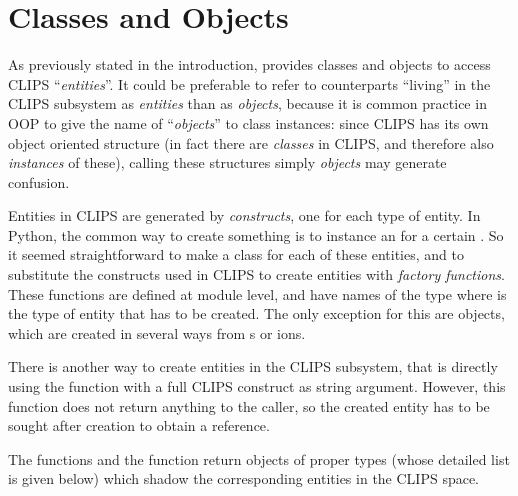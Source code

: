 \chapter{Classes and Objects\label{pyclips-objects}}

As previously stated in the introduction, \pyclips{} provides classes and
objects to access CLIPS ``\emph{entities}''. It could be preferable to
refer to counterparts ``living'' in the CLIPS subsystem as \emph{entities}
than as \emph{objects}, because it is common practice in OOP to give
the name of ``\emph{objects}'' to class instances: since CLIPS has its
own object oriented structure (in fact there are \emph{classes} in
CLIPS, and therefore also \emph{instances} of these), calling these
structures simply \emph{objects} may generate confusion.

Entities in CLIPS are generated by \emph{constructs}, one for each type
of entity. In Python, the common way to create something is to instance
an  for a certain . So it seemed straightforward
to make a class for each of these entities, and to substitute the constructs
used in CLIPS to create entities with \emph{factory functions}. These
functions are defined at module level, and have names of the type
 where  is the
type of entity that has to be created. The only exception for this are
 objects, which are created in several ways from
s or ions.

There is another way to create entities in the CLIPS subsystem, that is
directly using the  function with a full CLIPS
construct as string argument. However, this function does not return
anything to the caller, so the created entity has to be sought after
creation to obtain a reference.

The  functions and the 
function return objects of proper types (whose detailed list is given
below) which shadow the corresponding entities in the CLIPS space.





